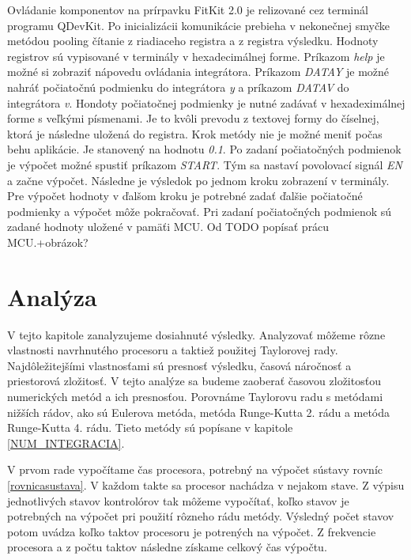 Ovládanie komponentov na prírpavku FitKit 2.0 je relizované cez terminál programu QDevKit. Po inicializácii komunikácie prebieha v nekonečnej smyčke metódou pooling čítanie z riadiaceho registra a z registra výsledku. Hodnoty registrov sú vypisované v terminály v hexadecimálnej forme. Príkazom \textit{help} je možné si zobraziť nápovedu ovládania integrátora. Príkazom \textit{DATAY} je možné nahráť počiatočnú podmienku do integrátora \textit{y} a príkazom \textit{DATAV} do integrátora \textit{v}. Hondoty počiatočnej podmienky je nutné zadávať v hexadeximálnej forme s veľkými písmenami. Je to kvôli prevodu z textovej formy do číselnej, ktorá je následne uložená do registra. Krok metódy nie je možné meniť počas behu aplikácie. Je stanovený na hodnotu \textit{0.1}. Po zadaní počiatočných podmienok je výpočet možné spustiť príkazom \textit{START}. Tým sa nastaví povolovací signál \textit{EN} a začne výpočet. Následne je výsledok po jednom kroku zobrazení v terminály. Pre výpočet hodnoty v ďalšom kroku je potrebné zadať ďalšie počiatočné podmienky a výpočet môže pokračovať.
Pri zadaní počiatočných podmienok sú zadané hodnoty uložené v pamäťi MCU. Od
TODO popísať prácu MCU.+obrázok? 


\chapter{Analýza}
V tejto kapitole zanalyzujeme dosiahnuté výsledky. Analyzovať môžeme rôzne vlastnosti navrhnutého procesoru a taktiež použitej Taylorovej rady. Najdôležitejšími vlastnosťami sú presnosť výsledku, časová náročnosť a priestorová zložitosť. V tejto analýze sa budeme zaoberať časovou zložitosťou numerických metód a ich presnosťou. Porovnáme Taylorovu radu s metódami nižších rádov, ako sú Eulerova metóda, metóda Runge-Kutta 2. rádu a metóda Runge-Kutta 4. rádu. Tieto metódy sú popísane v kapitole \ref{NUM_INTEGRACIA}.

V prvom rade vypočítame čas procesora, potrebný na výpočet sústavy rovníc \ref{rovnicasustava}. V každom takte sa procesor nachádza v nejakom stave. Z výpisu jednotlivých stavov kontrolórov tak môžeme vypočítať, koľko stavov je potrebných na výpočet pri použití rôzneho rádu metódy. Výsledný počet stavov potom uvádza koľko taktov procesoru je potrených na výpočet. Z frekvencie procesora a z počtu taktov následne získame celkový čas výpočtu.

